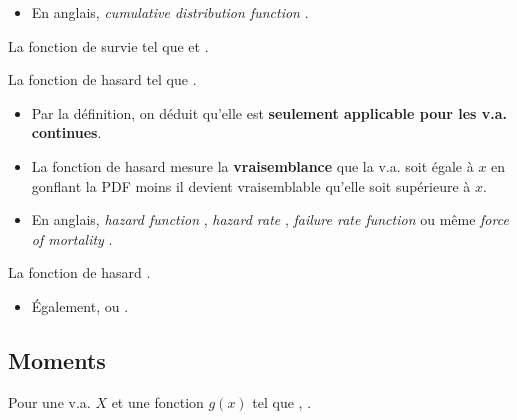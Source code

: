 \documentclass[10pt, french]{article}
\begin{document}
\begin{multicols*}{2}
\begin{definitionNOHFILL}
\begin{itemize}
	\item	En anglais, \og \textit{cumulative distribution function} \fg{}.
\end{itemize}
\end{definitionNOHFILL}

\begin{definitionNOHFILL}
La fonction de survie  tel que  et .
\end{definitionNOHFILL}

\begin{definitionNOHFILL}
La fonction de hasard  tel que .

\begin{itemize}
	\item	Par la définition, on déduit qu'elle est \textbf{seulement applicable pour les v.a. continues}.
	\item	La fonction de hasard mesure la \textbf{vraisemblance} que la v.a. soit égale à $x$ en gonflant la PDF moins il devient vraisemblable qu'elle soit supérieure à $x$.
\end{itemize}

\begin{itemize}
	\item	En anglais, \og \textit{hazard function} \fg{}, \og \textit{hazard rate} \fg{}, \og \textit{failure rate function} \fg{} ou même \og \textit{force of mortality} \fg{}.
\end{itemize}
\end{definitionNOHFILL}

\begin{definitionNOHFILL}
La fonction de hasard .
\begin{itemize}
	\item	Également,  ou .
\end{itemize}
\end{definitionNOHFILL}


\columnbreak
\subsection{Moments}
Pour une v.a. $X$   et une fonction $g(x)$ tel que  , .


\end{multicols*}
\end{document}
